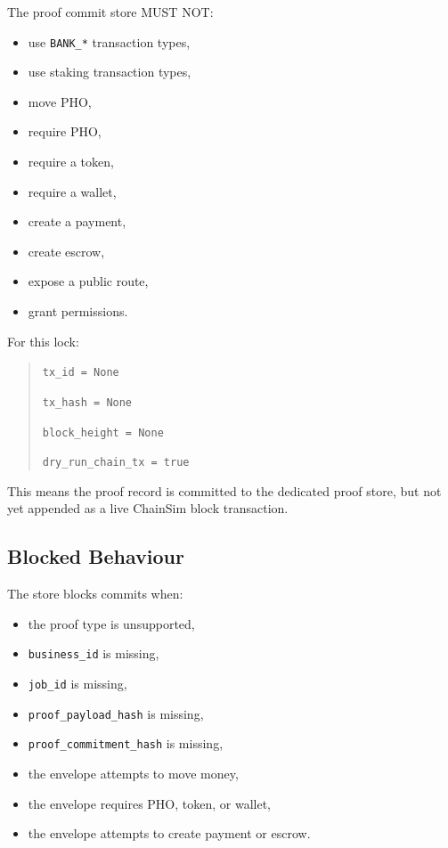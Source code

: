 The proof commit store MUST NOT:

\begin{itemize}
  \item use \texttt{BANK\_*} transaction types,
  \item use staking transaction types,
  \item move PHO,
  \item require PHO,
  \item require a token,
  \item require a wallet,
  \item create a payment,
  \item create escrow,
  \item expose a public route,
  \item grant permissions.
\end{itemize}

For this lock:

\begin{quote}
\texttt{tx\_id = None}

\texttt{tx\_hash = None}

\texttt{block\_height = None}

\texttt{dry\_run\_chain\_tx = true}
\end{quote}

This means the proof record is committed to the dedicated proof store, but not yet appended as a live ChainSim block transaction.

\subsection{Blocked Behaviour}

The store blocks commits when:

\begin{itemize}
  \item the proof type is unsupported,
  \item \texttt{business\_id} is missing,
  \item \texttt{job\_id} is missing,
  \item \texttt{proof\_payload\_hash} is missing,
  \item \texttt{proof\_commitment\_hash} is missing,
  \item the envelope attempts to move money,
  \item the envelope requires PHO, token, or wallet,
  \item the envelope attempts to create payment or escrow.
\end{itemize}

